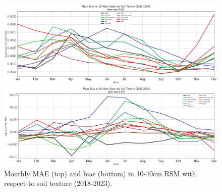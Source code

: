\begin{figure}[h!]
    \centering

    \includegraphics[width=.99\linewidth,draft=false]{figures/grid-eval_qtrly/eval-grid_full_lstm-rsm-9_pixelwise-time-stats_monthly-txtr-abs-err-state-rsm-40.png}

    \includegraphics[width=.99\linewidth,draft=false]{figures/grid-eval_qtrly/eval-grid_full_lstm-rsm-9_pixelwise-time-stats_monthly-txtr-bias-state-rsm-40.png}

    \caption{Monthly MAE (top) and bias (bottom) in 10-40cm RSM with respect to soil texture (2018-2023).}
    \label{bulk-eval_monthly_txtr-bias_rsm-40}
\end{figure}


